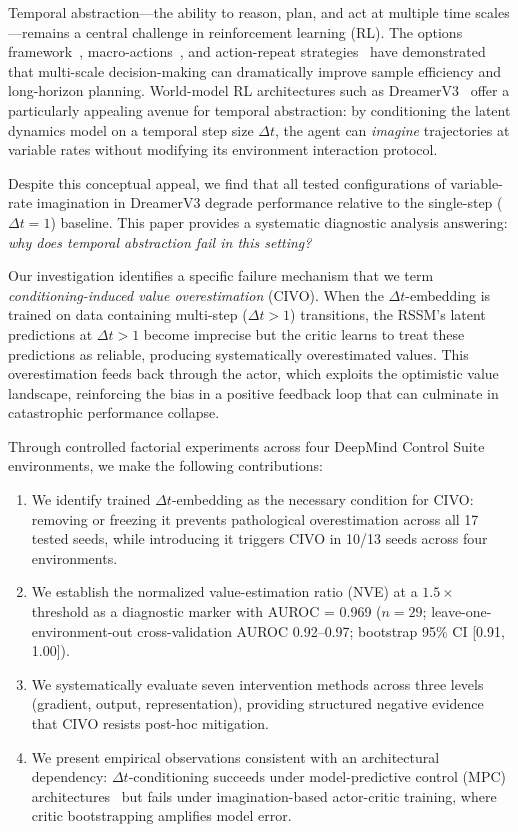 \documentclass[10pt,letterpaper]{article}
\newcommand{\dt}{\Delta t}
\begin{document}
Temporal abstraction---the ability to reason, plan, and act at multiple time scales---remains a central challenge in reinforcement learning (RL). The options framework~\citep{sutton1999between}, macro-actions~\citep{durugkar2016deep}, and action-repeat strategies~\citep{lakshminarayanan2017dynamic} have demonstrated that multi-scale decision-making can dramatically improve sample efficiency and long-horizon planning. World-model RL architectures such as DreamerV3~\citep{hafner2023mastering} offer a particularly appealing avenue for temporal abstraction: by conditioning the latent dynamics model on a temporal step size $\dt$, the agent can \emph{imagine} trajectories at variable rates without modifying its environment interaction protocol.

Despite this conceptual appeal, we find that all tested configurations of variable-rate imagination in DreamerV3 degrade performance relative to the single-step ($\dt=1$) baseline. This paper provides a systematic diagnostic analysis answering: \emph{why does temporal abstraction fail in this setting?}

Our investigation identifies a specific failure mechanism that we term \emph{conditioning-induced value overestimation} (CIVO). When the $\dt$-embedding is trained on data containing multi-step ($\dt > 1$) transitions, the RSSM's latent predictions at $\dt > 1$ become imprecise but the critic learns to treat these predictions as reliable, producing systematically overestimated values. This overestimation feeds back through the actor, which exploits the optimistic value landscape, reinforcing the bias in a positive feedback loop that can culminate in catastrophic performance collapse.

Through controlled factorial experiments across four DeepMind Control Suite environments, we make the following contributions:
\begin{enumerate}[itemsep=2pt]
    \item We identify trained $\dt$-embedding as the necessary condition for CIVO: removing or freezing it prevents pathological overestimation across all 17 tested seeds, while introducing it triggers CIVO in 10/13 seeds across four environments.
    \item We establish the normalized value-estimation ratio (NVE) at a $1.5\times$ threshold as a diagnostic marker with AUROC = 0.969 ($n=29$; leave-one-environment-out cross-validation AUROC 0.92--0.97; bootstrap 95\% CI [0.91, 1.00]).
    \item We systematically evaluate seven intervention methods across three levels (gradient, output, representation), providing structured negative evidence that CIVO resists post-hoc mitigation.
    \item We present empirical observations consistent with an architectural dependency: $\dt$-conditioning succeeds under model-predictive control (MPC) architectures~\citep{nhu2025tawm} but fails under imagination-based actor-critic training, where critic bootstrapping amplifies model error.
\end{enumerate}
\end{document}
